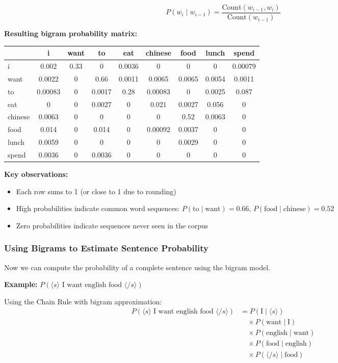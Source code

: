 \documentclass[11pt,a4paper]{article}
\theoremstyle{definition}
\theoremstyle{plain}
\theoremstyle{remark}
\begin{document}
\[
P(w_i \mid w_{i-1}) = \frac{\text{Count}(w_{i-1}, w_i)}{\text{Count}(w_{i-1})}
\]

\textbf{Resulting bigram probability matrix:}

\begin{center}
\begin{tabular}{|l||c|c|c|c|c|c|c|c|}
\hline
 & i & want & to & eat & chinese & food & lunch & spend \\
\hline\hline
i & 0.002 & 0.33 & 0 & 0.0036 & 0 & 0 & 0 & 0.00079 \\
want & 0.0022 & 0 & 0.66 & 0.0011 & 0.0065 & 0.0065 & 0.0054 & 0.0011 \\
to & 0.00083 & 0 & 0.0017 & 0.28 & 0.00083 & 0 & 0.0025 & 0.087 \\
eat & 0 & 0 & 0.0027 & 0 & 0.021 & 0.0027 & 0.056 & 0 \\
chinese & 0.0063 & 0 & 0 & 0 & 0 & 0.52 & 0.0063 & 0 \\
food & 0.014 & 0 & 0.014 & 0 & 0.00092 & 0.0037 & 0 & 0 \\
lunch & 0.0059 & 0 & 0 & 0 & 0 & 0.0029 & 0 & 0 \\
spend & 0.0036 & 0 & 0.0036 & 0 & 0 & 0 & 0 & 0 \\
\hline
\end{tabular}
\end{center}

\textbf{Key observations:}
\begin{itemize}
    \item Each row sums to 1 (or close to 1 due to rounding)
    \item High probabilities indicate common word sequences: $P(\text{to} \mid \text{want}) = 0.66$, $P(\text{food} \mid \text{chinese}) = 0.52$
    \item Zero probabilities indicate sequences never seen in the corpus
\end{itemize}

\subsubsection{Using Bigrams to Estimate Sentence Probability}

Now we can compute the probability of a complete sentence using the bigram model.

\textbf{Example:} $P(\langle s \rangle \text{ I want english food } \langle /s \rangle)$

Using the Chain Rule with bigram approximation:
\begin{align*}
P(\langle s \rangle \text{ I want english food } \langle /s \rangle) &= P(\text{I} \mid \langle s \rangle) \\
&\quad \times P(\text{want} \mid \text{I}) \\
&\quad \times P(\text{english} \mid \text{want}) \\
&\quad \times P(\text{food} \mid \text{english}) \\
&\quad \times P(\langle /s \rangle \mid \text{food})
\end{align*}
\end{document}
